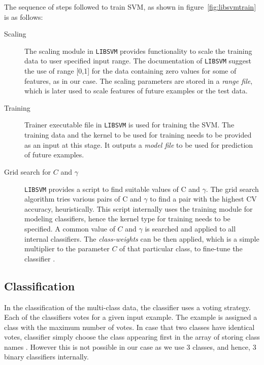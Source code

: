The sequence of steps followed to train SVM, as shown in figure~\ref{fig:libsvmtrain} is as follows:
\begin{description}

  \item[Scaling] The scaling module in \texttt{LIBSVM} provides functionality to scale the training data to user specified input range. The documentation of \texttt{LIBSVM} \cite{Hsu2003} suggest the use of range [0,1] for the data containing zero values for some of features, as in our case. The scaling parameters are stored in a \emph{range file}, which is later used to scale features of future examples or the test data.

   \item[Training] Trainer executable file in \texttt{LIBSVM} is used for training the SVM. The training data and the kernel to be used for training needs to be provided as an input at this stage. It outputs a \emph{model file} to be used for prediction of future examples.

  \item[Grid search for $C$ and $\gamma$] \texttt{LIBSVM} provides a script to find suitable values of C and $\gamma$. The grid search  algorithm tries various pairs of C and $\gamma$ to find a pair with the highest CV accuracy, heuristically. This script internally uses the training module for modeling classifiers, hence the kernel type for training needs to be specified. A common value of $C$ and $\gamma$ is searched and applied to all internal classifiers. The \emph{class-weights} can be then applied, which is a simple multiplier to the parameter $C$ of that particular class, to fine-tune the classifier \cite{Chang2011}.
 
\end{description}

\subsection{Classification}

In the classification of the multi-class data, the classifier uses a voting strategy. Each of the classifiers votes for a given input example. The example is assigned a class with the maximum number of votes. In case that two classes have identical votes, classifier simply choose the class appearing first in the array of storing class names \cite{Chang2011}. However this is not possible in our case as we use 3 classes, and hence, 3 binary classifiers internally.


